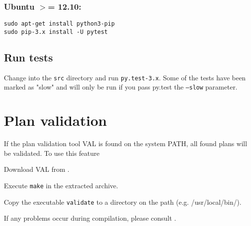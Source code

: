 \documentclass{article}
\begin{document}
\hypertarget{toc19}{}
\subsubsection*{Ubuntu $>$= 12.10:}

\begin{verbatim}
sudo apt-get install python3-pip
sudo pip-3.x install -U pytest
\end{verbatim}

\hypertarget{toc20}{}
\subsection{Run tests}

Change into the \texttt{src} directory and run \texttt{py.test-3.x}.
Some of the tests have been marked as "slow" and will only be run if you pass
py.test the \texttt{--slow} parameter.


\hypertarget{toc21}{}
\section{Plan validation}

If the plan validation tool VAL is found on the system PATH, all found plans
will be validated. To use this feature

\begin{compactitem}
\item Download VAL from .
\item Execute \texttt{make} in the extracted archive.
\item Copy the executable \texttt{validate} to a directory on the path
  (e.g. /usr/local/bin/).
\item If any problems occur during compilation, please consult
  .
\end{compactitem}

\end{document}
